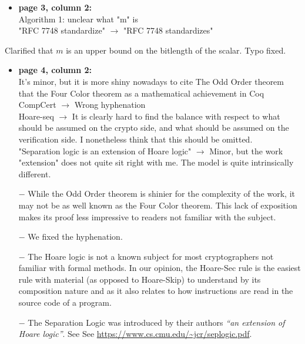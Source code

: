 \begin{itemize}
  \item \textbf{page 3, column 2:}\\
        Algorithm 1: unclear what "m" is\\
        "RFC 7748 standardize" $\rightarrow$   "RFC 7748 standardizes"
\end{itemize}
\begin{answer}
  Clarified that $m$ is an upper bound on the bitlength of the scalar. Typo fixed.
\end{answer}

\begin{itemize}
  \item \textbf{page 4, column 2:}\\
        It's minor, but it is more shiny nowadays to cite The Odd Order theorem that the Four Color theorem as a mathematical achievement in Coq\\
        CompCert $\rightarrow$ Wrong hyphenation\\
        Hoare-seq $\rightarrow$ It is clearly hard to find the balance with respect to what should be assumed on the crypto side, and what should be assumed on the verification side. I nonetheless think that this should be omitted.\\
        "Separation logic is an extension of Hoare logic" $\rightarrow$ Minor, but the work "extension" does not quite sit right with me. The model is quite intrinsically different.
\end{itemize}
\begin{answer}
  \begin{itemize}
    \item[$-$] While the Odd Order theorem is shinier for the complexity of the work, it may not be as well known as the Four Color theorem. This lack of exposition makes its proof less impressive to readers not familiar with the subject.
    \item[$-$] We fixed the hyphenation.
    \item[$-$] The Hoare logic is not a known subject for most cryptographers not familiar with formal methods. In our opinion, the Hoare-Sec rule is the easiest rule with material (as opposed to Hoare-Skip) to understand by its composition nature and as it also relates to how instructions are read in the source code of a program.
    \item[$-$] The Separation Logic was introduced by their authors \emph{``an extension of Hoare logic''}. See See \url{https://www.cs.cmu.edu/~jcr/seplogic.pdf}.
  \end{itemize}

\end{answer}

